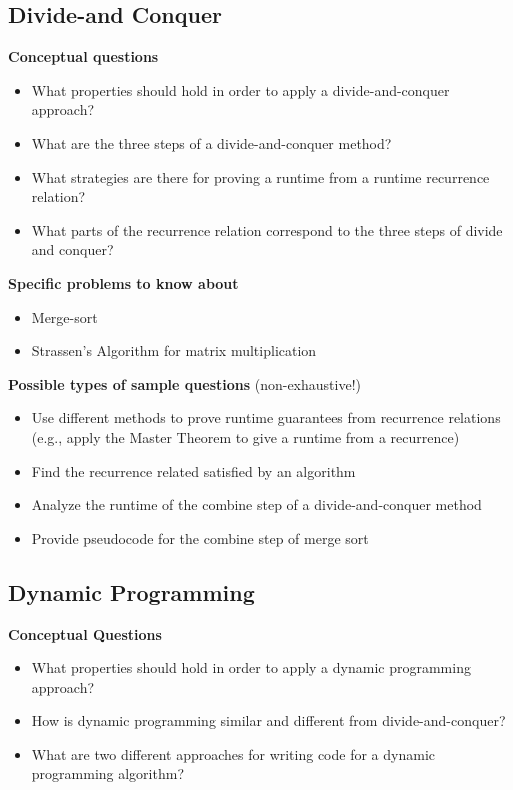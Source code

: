 \documentclass[11  pt]{exam}
\begin{document}
	\subsection{Divide-and Conquer}
	
	\textbf{Conceptual questions}
	\begin{itemize}
		\item What properties should hold in order to apply a divide-and-conquer approach?
		\item What are the three steps of a divide-and-conquer method? 
		\item What strategies are there for proving a runtime from a runtime recurrence relation?
		\item What parts of the recurrence relation correspond to the three steps of divide and conquer?
	\end{itemize}
	
	\textbf{Specific problems to know about}
	\begin{itemize}
		\item Merge-sort
		\item Strassen's Algorithm for matrix multiplication
	\end{itemize}
	
	\textbf{Possible types of sample questions} (non-exhaustive!)
	\begin{itemize}
		\item Use different methods to prove runtime guarantees from recurrence relations (e.g., apply the Master Theorem to give a runtime from a recurrence)
		\item Find the recurrence related satisfied by an algorithm
		\item Analyze the runtime of the combine step of a divide-and-conquer method
		\item Provide pseudocode for the combine step of merge sort
	\end{itemize}
	
	\subsection{Dynamic Programming}
	\textbf{Conceptual Questions}
	\begin{itemize}
		\item What properties should hold in order to apply a dynamic programming approach?
		\item How is dynamic programming similar and different from divide-and-conquer?
		\item What are two different approaches for writing code for a dynamic programming algorithm?
	\end{itemize}
	
\end{document}
